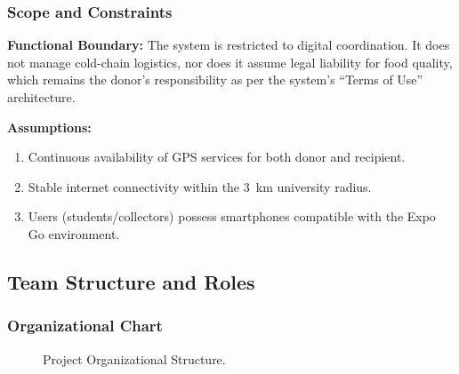 \documentclass[9pt,conference]{IEEEtran}
\begin{document}
\subsubsection{Scope and Constraints}

\textbf{Functional Boundary:} The system is restricted to digital coordination. It does not manage cold-chain logistics, nor does it assume legal liability for food quality, which remains the donor's responsibility as per the system's ``Terms of Use'' architecture.

\textbf{Assumptions:}
\begin{enumerate}
    \item Continuous availability of GPS services for both donor and recipient.
    \item Stable internet connectivity within the 3~km university radius.
    \item Users (students/collectors) possess smartphones compatible with the Expo Go environment.
\end{enumerate}

\subsection{Team Structure and Roles}

\subsubsection{Organizational Chart}

\begin{figure}[htbp]
\centering
{}
\caption{Project Organizational Structure.}
\label{fig:org-chart}
\end{figure}
\end{document}
